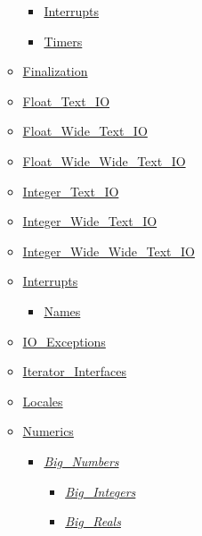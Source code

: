 \documentclass[english]{article}
\begin{document}
\begin{scriptsize}
\begin{multicols*}{5}
\begin{itemize}[leftmargin=0mm]
\begin{itemize}[leftmargin=5mm]
\begin{itemize}[leftmargin=5mm]
	\item[] \href{http://www.ada-auth.org/standards/22rm/html/RM-D-14-3.html}{Interrupts}
	\item[] \href{http://www.ada-auth.org/standards/22rm/html/RM-D-14-1.html}{Timers}
	\end{itemize}
  \item[] \href{http://www.ada-auth.org/standards/22rm/html/RM-7-6.html}{Finalization}
  \item[] \href{http://www.ada-auth.org/standards/22rm/html/RM-A-10-9.html}{Float\_Text\_IO}
  \item[] \href{http://www.ada-auth.org/standards/22rm/html/RM-A-11.html}{Float\_Wide\_Text\_IO}
  \item[] \href{http://www.ada-auth.org/standards/22rm/html/RM-A-11.html}{Float\_Wide\_Wide\_Text\_IO}
  \item[] \href{http://www.ada-auth.org/standards/22rm/html/RM-A-10-8.html}{Integer\_Text\_IO}
  \item[] \href{http://www.ada-auth.org/standards/22rm/html/RM-A-11.html}{Integer\_Wide\_Text\_IO}
  \item[] \href{http://www.ada-auth.org/standards/22rm/html/RM-A-11.html}{Integer\_Wide\_Wide\_Text\_IO}
  \item[] \href{http://www.ada-auth.org/standards/22rm/html/RM-C-3-2.html}{Interrupts}
	\begin{itemize}[leftmargin=5mm]
	\item[] \href{http://www.ada-auth.org/standards/22rm/html/RM-C-3-2.html}{Names}
	\end{itemize}
  \item[] \href{http://www.ada-auth.org/standards/22rm/html/RM-A-13.html}{IO\_Exceptions}
  \item[] \href{http://www.ada-auth.org/standards/22rm/html/RM-5-5-1.html}{Iterator\_Interfaces}
  \item[] \href{http://www.ada-auth.org/standards/22rm/html/RM-A-19.html}{Locales}
  \item[] \href{http://www.ada-auth.org/standards/22rm/html/RM-A-5.html}{Numerics}
	\begin{itemize}[leftmargin=5mm]
	\item[] \href{http://www.ada-auth.org/standards/22rm/html/RM-A-5-5.html}{\textit{Big\_Numbers}}
	  \begin{itemize}[leftmargin=5mm]
	  \item[] \href{http://www.ada-auth.org/standards/22rm/html/RM-A-5-6.html}{\textit{Big\_Integers}}
	  \item[] \href{http://www.ada-auth.org/standards/22rm/html/RM-A-5-7.html}{\textit{Big\_Reals}}

\end{itemize}
\end{itemize}
\end{itemize}
\end{itemize}
\end{multicols*}
\end{scriptsize}
\end{document}
